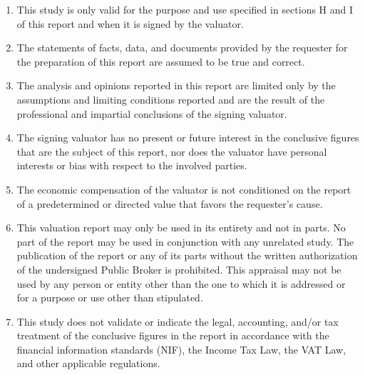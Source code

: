 \begin{enumerate}


\item This study is only valid for the purpose and use specified in sections H and I of this report and when it is signed by the valuator.
\item The statements of facts, data, and documents provided by the requester for the preparation of this report are assumed to be true and correct.
\item  The analysis and opinions reported in this report are limited only by the assumptions and limiting conditions reported and are the result of the professional and impartial conclusions of the signing valuator.
\item  The signing valuator has no present or future interest in the conclusive figures that are the subject of this report, nor does the valuator have personal interests or bias with respect to the involved parties.
\item  The economic compensation of the valuator is not conditioned on the report of a predetermined or directed value that favors the requester's cause.
\item  This valuation report may only be used in its entirety and not in parts. No part of the report may be used in conjunction with any unrelated study. The publication of the report or any of its parts without the written authorization of the undersigned Public Broker is prohibited. This appraisal may not be used by any person or entity other than the one to which it is addressed or for a purpose or use other than stipulated.
\item  This study does not validate or indicate the legal, accounting, and/or tax treatment of the conclusive figures in the report in accordance with the financial information standards (NIF), the Income Tax Law, the VAT Law, and other applicable regulations.
	
\end{enumerate}